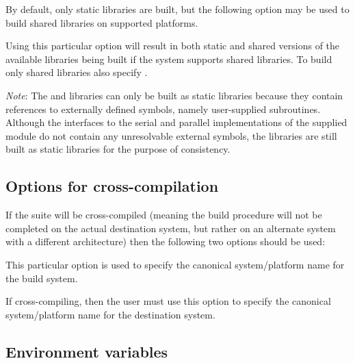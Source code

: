 \noindent By default, only static libraries are built, but the following option
may be used to build shared libraries on supported platforms.

\begin{config}

\item {}

  Using this particular option will result in both static and shared versions
  of the available {\sundials} libraries being built if the system supports
  shared libraries. To build only shared libraries also specify .

  {\em Note}: The {\fcvode} and {\fkinsol} libraries can only be built as static
  libraries because they contain references to externally defined symbols, namely
  user-supplied {\F} subroutines.  Although the {\F} interfaces to the serial and
  parallel implementations of the supplied {\nvector} module do not contain any
  unresolvable external symbols, the libraries are still built as static libraries
  for the purpose of consistency.

\end{config}

\subsection*{Options for cross-compilation}


\noindent If the {\sundials} suite will be cross-compiled (meaning the build
procedure will not be completed on the actual destination system, but rather
on an alternate system with a different architecture) then the following two
options should be used:

\begin{config}

\item {}

  This particular option is used to specify the canonical system/platform name
  for the build system.

\item {}

  If cross-compiling, then the user must use this option to specify the canonical
  system/platform name for the destination system.

\end{config}

\subsection*{Environment variables}

